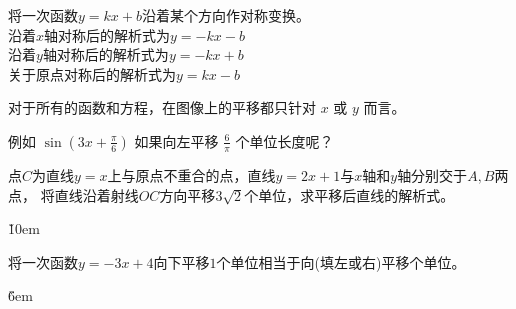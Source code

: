 \begin{theorem}
    \begin{minipage}[c]{0.55\textwidth}
        将一次函数$y=kx+b$沿着某个方向作对称变换。\\
        沿着$x$轴对称后的解析式为$y=-kx-b$ \\
        沿着$y$轴对称后的解析式为$y=-kx+b$ \\
        关于原点对称后的解析式为$y=kx-b$ %
    \end{minipage}%
    \begin{minipage}[c]{0.45\textwidth}
        \centering
    \end{minipage}
\end{theorem}

\begin{warning}
    对于所有的函数和方程，在图像上的平移都只针对 $x$ 或 $y$ 而言。

    例如 $\sin (3x+\frac{\pi}{6})$ 如果向左平移 $\frac6\pi$ 个单位长度呢？
\end{warning}

\begin{example}
    点$C$为直线$y=x$上与原点不重合的点，直线$y=2x+1$与$x$轴和$y$轴分别交于$A,B$两点，
    将直线沿着射线$OC$方向平移$3\sqrt2$个单位，求平移后直线的解析式。
\end{example}

\v{10em}

\begin{example}
    将一次函数$y=-3x+4$向下平移$1$个单位相当于向\underline{\quad}(填左或右)平移\underline{\quad}个单位。
\end{example}

\v{6em}

